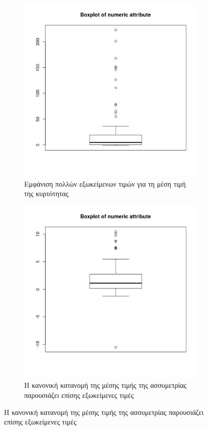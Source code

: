 \documentclass[]{article}
\numberwithin{equation}{section}		%
\numberwithin{figure}{section}			%
\numberwithin{table}{section}				%
\begin{document}
\begin{figure}[H]
    	\medskip
    	\begin{subfigure}{0.48\textwidth}
    		\includegraphics[width=\linewidth, height = 0.2\textheight]{KurtosisMean_boxplot.jpg}
    		\caption{Εμφάνιση πολλών εξωκείμενων τιμών για τη μέση τιμή της κυρτότητας} \label{fig:e}
    	\end{subfigure}\hspace*{\fill}
    	\begin{subfigure}{0.48\textwidth}
    		\includegraphics[width=\linewidth, height = 0.2\textheight]{SkewnessMean_boxplot.jpg}
    		\caption{Η κανονική κατανομή της μέσης τιμής της ασσυμετρίας παρουσιάζει επίσης εξωκείμενες τιμές} \label{fig:f}
    	\end{subfigure}
    	

\end{figure}
\end{document}
